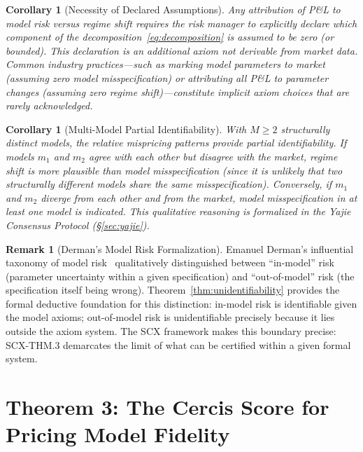 \documentclass[11pt,a4paper]{article}
\theoremstyle{plain}
\newtheorem{corollary}[theorem]{Corollary}
\theoremstyle{definition}
\newtheorem{remark}[theorem]{Remark}
\theoremstyle{remark}
\newcommand{\SCX}{\textsc{SCX}}
\begin{document}
\begin{corollary}[Necessity of Declared Assumptions]\label{cor:declared_assumptions}
Any attribution of P\&L to model risk versus regime shift requires the risk manager to explicitly declare which component of the decomposition~\eqref{eq:decomposition} is assumed to be zero (or bounded). This declaration is an \emph{additional axiom} not derivable from market data. Common industry practices---such as marking model parameters to market (assuming zero model misspecification) or attributing all P\&L to parameter changes (assuming zero regime shift)---constitute implicit axiom choices that are rarely acknowledged.
\end{corollary}

\begin{corollary}[Multi-Model Partial Identifiability]\label{cor:multi_model_partial}
With $M \geq 2$ structurally distinct models, the \emph{relative} mispricing patterns provide partial identifiability. If models $m_1$ and $m_2$ agree with each other but disagree with the market, regime shift is more plausible than model misspecification (since it is unlikely that two structurally different models share the same misspecification). Conversely, if $m_1$ and $m_2$ diverge from each other \emph{and} from the market, model misspecification in at least one model is indicated. This qualitative reasoning is formalized in the Yajie Consensus Protocol (\S\ref{sec:yajie}).
\end{corollary}

\begin{remark}[Derman's Model Risk Formalization]
Emanuel Derman's influential taxonomy of model risk~\citep{derman1996model} qualitatively distinguished between ``in-model'' risk (parameter uncertainty within a given specification) and ``out-of-model'' risk (the specification itself being wrong). Theorem~\ref{thm:unidentifiability} provides the formal deductive foundation for this distinction: in-model risk is identifiable given the model axioms; out-of-model risk is unidentifiable precisely because it lies outside the axiom system. The \SCX{} framework makes this boundary precise: \textsc{SCX-THM.3} demarcates the limit of what can be certified within a given formal system.
\end{remark}

\section{Theorem 3: The Cercis Score for Pricing Model Fidelity}
\end{document}
